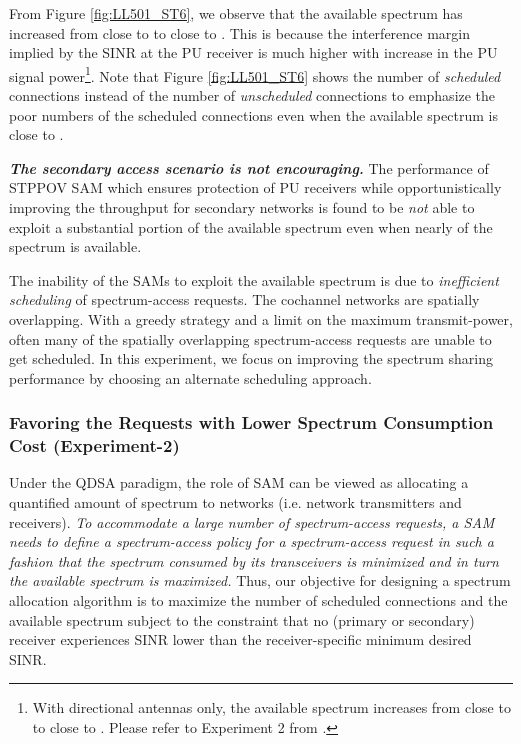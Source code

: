 \documentclass[12pt, draftclsnofoot, onecolumn]{IEEEtran}
\begin{document}
From Figure \ref{fig:LL501_ST6}, we observe that the available spectrum has increased from close to  to close to . This is because the interference margin implied by the SINR at the PU receiver is much higher with increase in the PU signal power\footnote{With directional antennas only, the available spectrum increases from close to  to close to . Please refer to Experiment 2 from \cite{oms3_cf1}.}.  Note that Figure \ref{fig:LL501_ST6} shows the number of \textit{scheduled} connections instead of the number of \textit{unscheduled} connections to emphasize the poor numbers of the scheduled connections even when the available spectrum is close to .

\textbf{\textit{The secondary access scenario is not encouraging.}} The performance of STPPOV SAM which ensures protection of PU receivers while opportunistically improving the throughput for secondary networks is found to be \textit{not} able to exploit a substantial portion of the available spectrum even when nearly   of the spectrum is available. 

The inability of the SAMs to exploit the available spectrum is due to \textit{inefficient scheduling} of spectrum-access requests. The cochannel networks are spatially overlapping. With a greedy strategy and a limit on the maximum transmit-power, often many of the spatially overlapping spectrum-access requests are unable to get scheduled. In this experiment, we focus on improving the spectrum sharing performance by choosing an alternate scheduling approach. 

\subsubsection{Favoring the Requests with Lower Spectrum Consumption Cost (Experiment-2)}
Under the QDSA paradigm, the role of SAM can be viewed as allocating a quantified amount of spectrum to networks (i.e. network transmitters and receivers). \textit{To accommodate a large number of spectrum-access requests, a SAM needs to define a spectrum-access policy for a spectrum-access request in such a fashion that the spectrum consumed by its transceivers is minimized and in turn the available spectrum is maximized.} Thus, our objective for designing a spectrum allocation algorithm is to maximize the number of scheduled connections and the available spectrum subject to the constraint that no (primary or secondary) receiver experiences SINR lower than the receiver-specific minimum desired SINR.
\end{document}
